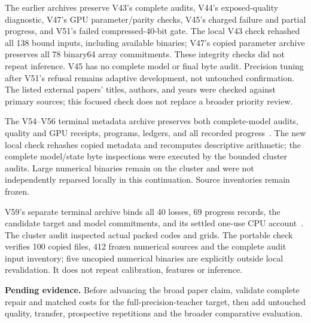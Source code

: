 \documentclass[10pt,twocolumn,letterpaper]{article}
\newcommand{\pending}[1]{\par\noindent\textbf{Pending evidence.} #1\par}
\begin{document}
The earlier archives preserve V43's complete audits, V44's exposed-quality
diagnostic, V47's GPU parameter/parity checks, V45's charged failure and partial
progress, and V51's failed compressed-40-bit gate. The local V43 check rehashed
all 138 bound inputs, including available binaries; V47's copied parameter
archive preserves all 78 binary64 array commitments. These integrity checks did
not repeat inference. V45 has no complete model or final byte audit. Precision
tuning after V51's refusal remains adaptive development, not untouched confirmation. The listed external papers' titles,
authors, and years were checked against primary
sources; this focused check does not replace a broader priority review.

The V54--V56 terminal metadata archive preserves both complete-model audits,
quality and GPU receipts, programs, ledgers, and all recorded progress~\cite{v58terminal}.
The new local check rehashes copied metadata and recomputes descriptive arithmetic;
the complete model/state byte inspections were executed by the bounded cluster
audits. Large numerical binaries remain on the cluster and were not independently
reparsed locally in this continuation. Source inventories remain frozen.

V59's separate terminal archive binds all 40 losses, 69 progress records, the
candidate target and model commitments, and its settled one-use CPU account~\cite{v59terminal}.
The cluster audit inspected actual packed codes and grids. The portable check
verifies 100 copied files, 412 frozen numerical sources and the complete audit
input inventory; five uncopied numerical binaries are explicitly outside local
revalidation. It does not repeat calibration, features or inference.

\pending{Before advancing the broad paper claim, validate complete repair and matched
costs for the full-precision-teacher target, then add untouched quality, transfer,
prospective repetitions and the broader comparative evaluation.}
\end{document}
